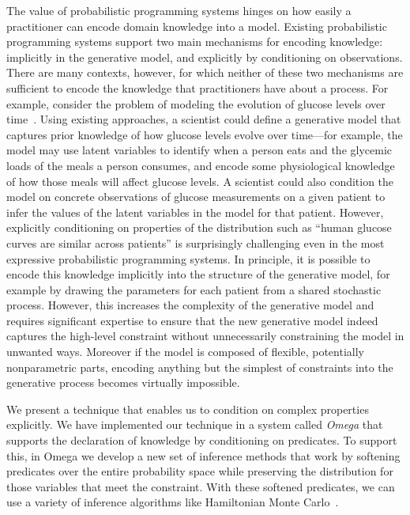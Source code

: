 The value of probabilistic programming systems hinges on how easily a practitioner can encode domain knowledge into a model. Existing probabilistic programming systems support two main mechanisms for encoding knowledge: implicitly in the generative model, and explicitly by conditioning on observations. There are many contexts, however, for which neither of these two mechanisms are sufficient to encode the knowledge that practitioners have about a process. For example, consider the problem of modeling the evolution of glucose levels over time~\citep{levine2017offline}. Using existing approaches, a scientist could define a generative model that captures prior knowledge of how glucose levels evolve over time---for example, the model may use latent variables to identify when a person eats and the glycemic loads of the meals a person consumes, and encode some physiological knowledge of how those meals will affect glucose levels. A scientist could also condition the model on concrete observations of glucose measurements on a given patient to infer the values of the latent variables in the model for that patient. However, explicitly conditioning on properties of the distribution such as ``human glucose curves are similar across patients'' is surprisingly challenging even in the most expressive probabilistic programming systems. 
In principle, it is possible to encode this knowledge implicitly into the structure of the generative model, for example by drawing the parameters for each patient from a shared stochastic process.
However, this increases the complexity of the generative model and requires significant expertise to ensure that the new generative model indeed captures the high-level constraint without unnecessarily constraining the model in unwanted ways.
Moreover if the model is composed of flexible, potentially nonparametric parts, encoding anything but the simplest of constraints into the generative process becomes virtually impossible.

We present a technique that enables us to condition on complex properties explicitly. We have implemented our technique in a system called \emph{Omega} that supports the declaration of knowledge by conditioning on predicates. To support this, in Omega we develop a new set of inference methods that work by softening predicates
over the entire probability space while preserving the distribution for those variables that meet the
constraint. With these softened predicates, we can use a variety of inference algorithms like Hamiltonian Monte Carlo~\citep{neal2011mcmc}.

